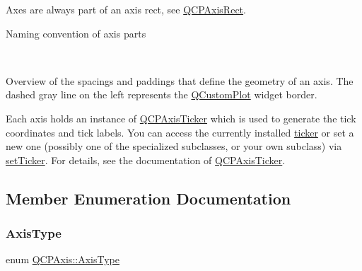 Axes are always part of an axis rect, see \hyperlink{class_q_c_p_axis_rect}{Q\+C\+P\+Axis\+Rect}.  \begin{center}Naming convention of axis parts\end{center}  ~\newline
  \begin{center}Overview of the spacings and paddings that define the geometry of an axis. The dashed gray line on the left represents the \hyperlink{class_q_custom_plot}{Q\+Custom\+Plot} widget border.\end{center} 

Each axis holds an instance of \hyperlink{class_q_c_p_axis_ticker}{Q\+C\+P\+Axis\+Ticker} which is used to generate the tick coordinates and tick labels. You can access the currently installed \hyperlink{class_q_c_p_axis_a7b7a27151be8235059e1294f73ecf615}{ticker} or set a new one (possibly one of the specialized subclasses, or your own subclass) via \hyperlink{class_q_c_p_axis_a4ee03fcd2c74d05cd1a419b9af5cfbdc}{set\+Ticker}. For details, see the documentation of \hyperlink{class_q_c_p_axis_ticker}{Q\+C\+P\+Axis\+Ticker}. 

\subsection{Member Enumeration Documentation}
\mbox{\label{class_q_c_p_axis_ae2bcc1728b382f10f064612b368bc18a}} 
\subsubsection{\texorpdfstring{Axis\+Type}{AxisType}}
{\footnotesize\ttfamily enum \hyperlink{class_q_c_p_axis_ae2bcc1728b382f10f064612b368bc18a}{Q\+C\+P\+Axis\+::\+Axis\+Type}}

